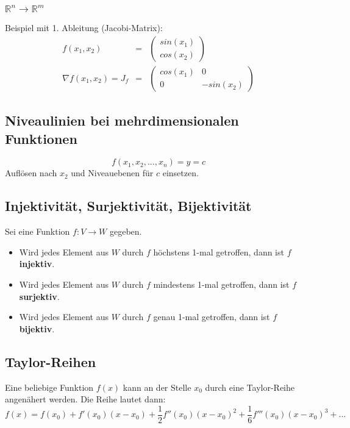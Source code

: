 \subsubsection{$\mathbb{R}^n \rightarrow \mathbb{R}^m$}
\label{ssub:rnrm}
Beispiel mit 1. Ableitung (Jacobi-Matrix): 
\begin{eqnarray*}
	f(x_1,x_2) &=& \left(\begin{array}{c} sin(x_1) \\ cos(x_2)\end{array}\right) \\
	\nabla f(x_1,x_2) = J_f &=& \left( \begin{array}{cc} cos(x_1) & 0 \\ 0 & -sin(x_2) \end{array} \right)
\end{eqnarray*}	

\subsection{Niveaulinien bei mehrdimensionalen Funktionen}
\label{sub:niveaulinien_bei_mehrdimensionalen_funktionen}

\begin{equation}
	f(x_1,x_2,...,x_n) = y = c
\end{equation}
Auflösen nach $x_2$ und Niveauebenen für $c$ einsetzen.

\subsection{Injektivit\"{a}t, Surjektivit\"{a}t, Bijektivit\"{a}t}
\label{sub:injektivitaet_surjektivitaet_bijektivitaet}

Sei eine Funktion $f : V \rightarrow W$ gegeben.

\begin{itemize}
	\item Wird jedes Element aus $W$ durch $f$ höchstens 1-mal getroffen, dann ist $f$ \textbf{injektiv}.
	\item Wird jedes Element aus $W$ durch $f$ mindestens 1-mal getroffen, dann ist $f$ \textbf{surjektiv}.
	\item Wird jedes Element aus $W$ durch $f$ genau 1-mal getroffen, dann ist $f$ \textbf{bijektiv}.
\end{itemize}

\subsection{Taylor-Reihen}
\label{sub:taylor_reihen}

Eine beliebige Funktion $f(x)$ kann an der Stelle $x_0$ durch eine Taylor-Reihe
angenähert werden. Die Reihe lautet dann: 
\begin{equation}
	f(x) = f(x_0) + f'(x_0)(x-x_0) + \frac{1}{2}f''(x_0)(x-x_0)^2 
	+ \frac{1}{6}f'''(x_0)(x-x_0)^3 + ...
\end{equation}